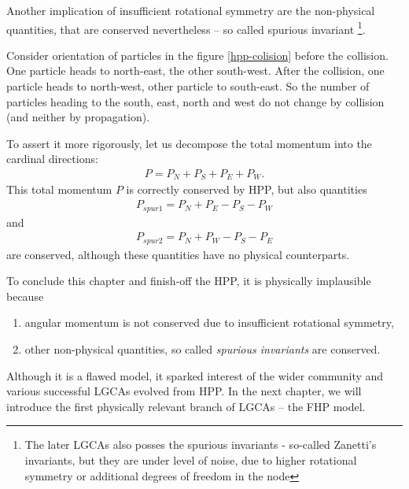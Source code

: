 \bigskip
Another implication of insufficient rotational symmetry are the non-physical quantities, that are conserved nevertheless -- so called spurious invariant \footnote{The later LGCAs also posses the spurious invariants - so-called Zanetti's invariants, but they are under level of noise, due to higher rotational symmetry or additional degrees of freedom in the node}.

Consider orientation of particles in the figure \ref{hpp-colision} before the collision.
One particle heads to north-east, the other south-west.
After the collision, one particle heads to north-west, other particle to south-east.
So the number of particles heading to the south, east, north and west do not change by collision (and neither by propagation).

To assert it more rigorously, let us decompose the total momentum into the cardinal directions:
\begin{align} 
P = P_N + P_S + P_E + P_W.
\end{align}
This total momentum $P$ is correctly conserved by HPP, but also quantities
\begin{align} \label{zanet}
P_{spur1} = P_N + P_E - P_S - P_W
\end{align}
and
\begin{align}
P_{spur2} = P_N + P_W - P_S - P_E
\end{align}
are conserved, although these quantities have no physical counterparts.

\bigskip

To conclude this chapter and finish-off the HPP, it is physically implausible because
\begin{enumerate}
\item angular momentum is not conserved due to insufficient rotational symmetry,
\item other non-physical quantities, so called \textit{spurious invariants} are conserved.
\end{enumerate}

Although it is a flawed model, it sparked interest of the wider community and various successful LGCAs evolved from HPP. In the next chapter, we will introduce the first physically relevant branch of LGCAs -- the FHP model.